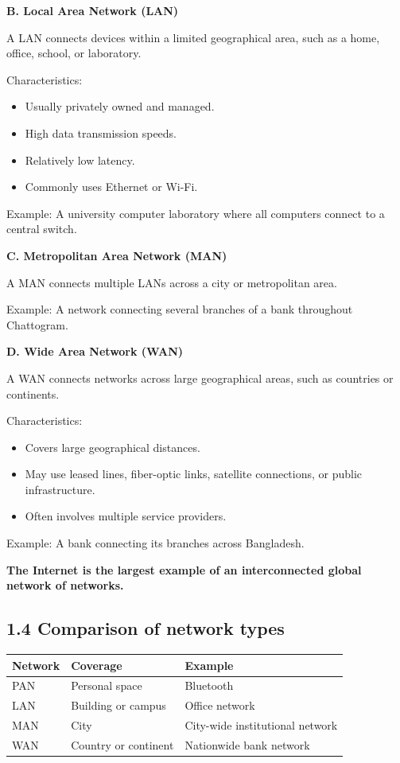 \textbf{B. Local Area Network (LAN)}

A LAN connects devices within a limited geographical area, such as a home, office, school, or laboratory.

Characteristics:

\begin{itemize}
    \item Usually privately owned and managed.
    \item High data transmission speeds.
    \item Relatively low latency.
    \item Commonly uses Ethernet or Wi-Fi.
\end{itemize}

Example: A university computer laboratory where all computers connect to a central switch.

\textbf{C. Metropolitan Area Network (MAN)}

A MAN connects multiple LANs across a city or metropolitan area.

Example: A network connecting several branches of a bank throughout Chattogram.

\textbf{D. Wide Area Network (WAN)}

A WAN connects networks across large geographical areas, such as countries or continents.

Characteristics:

\begin{itemize}
    \item Covers large geographical distances.
    \item May use leased lines, fiber-optic links, satellite connections, or public infrastructure.
    \item Often involves multiple service providers.
\end{itemize}

Example: A bank connecting its branches across Bangladesh.

\textbf{The Internet is the largest example of an interconnected global network of networks.}

\subsection{1.4 Comparison of network types}

\begin{table}[htbp]
\centering
\begin{tabularx}{\textwidth}{p{2.5cm} X X}
\toprule
\textbf{Network} & \textbf{Coverage} & \textbf{Example} \\
\midrule
PAN & Personal space & Bluetooth \\
LAN & Building or campus & Office network \\
MAN & City & City-wide institutional network \\
WAN & Country or continent & Nationwide bank network \\
\bottomrule
\end{tabularx}
\end{table}

